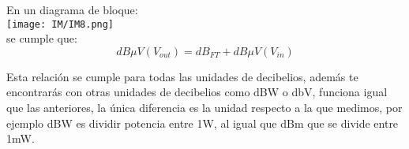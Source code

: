 \documentclass[
	12pt, %
	fleqn, %
	a4paper, %
]{LegrandOrangeBook}
\begin{document}
\begin{definition}\label{def:db ft}
En un diagrama de bloque:\\
\texttt{[image: IM/IM8.png]}\\
se cumple que:
\begin{equation}
\label{eq:db de ft}
dB\mu V(V_{out})=dB_{FT}+dB\mu V(V_{in})
\end{equation}
\end{definition}
\begin{remark}
Esta relación se cumple para todas las unidades de decibelios, además te encontrarás con otras unidades de decibelios como dBW o dbV, funciona igual que las anteriores, la única diferencia es la unidad respecto a la que medimos, por ejemplo dBW es dividir potencia entre 1W, al igual que dBm que se divide entre 1mW.
\end{remark}
\end{document}
